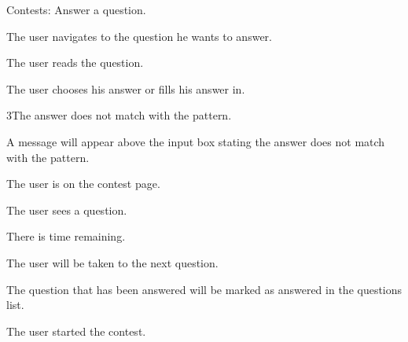 \documentclass[10pt,a4paper]{article}
\begin{document}
\begin{uc}{Contests: Answer a question.}


    \begin{uc-mss}
    \item The user navigates to the question he wants to answer.
    \item The user reads the question.
    \item The user chooses his answer or fills his answer in.
    \end{uc-mss}

    \begin{uc-ext}

        \begin{uc-fail}{3}{The answer does not match with the pattern.}
        \item A message will appear above the input box stating the answer does not match with the pattern.
        \end{uc-fail}

    \end{uc-ext}

    \begin{uc-pre}
    \item The user is on the contest page.
    \item The user sees a question. 
    \item There is time remaining. 
    \end{uc-pre}

    \begin{uc-post}
    \item The user will be taken to the next question.
    \item The question that has been answered will be marked as answered in the questions list. 
    \end{uc-post}

    \begin{uc-trig}
    The user started the contest. 
    \end{uc-trig}

\end{uc}
\end{document}
